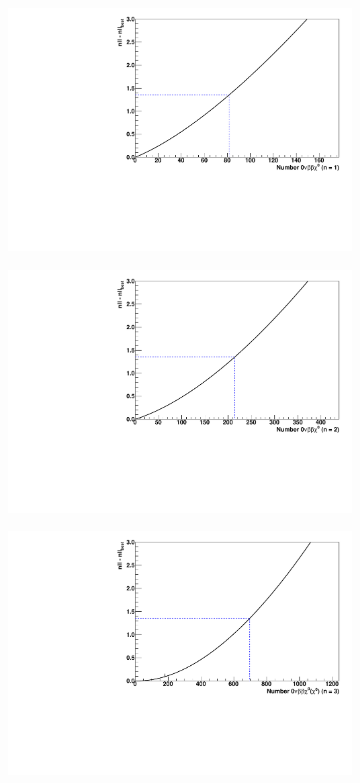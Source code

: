 \documentclass[herrin-thesis.tex]{subfiles}
\begin{document}
\begin{figure}[htbp]
\centering
	\begin{subfigure}[c]{0.48\textwidth}
	\centering
	\includegraphics[width=\textwidth]{./plots/analysis_bb0nX1_profile.pdf}
	\end{subfigure}\hfill%
	\begin{subfigure}[c]{0.48\textwidth}
	\centering
	\includegraphics[width=\textwidth]{./plots/analysis_bb0nX2_profile.pdf}
	\end{subfigure}
	\begin{subfigure}[c]{0.48\textwidth}
	\centering
	\includegraphics[width=\textwidth]{./plots/analysis_bb0nX3_profile.pdf}

\end{subfigure}
\end{figure}
\end{document}
